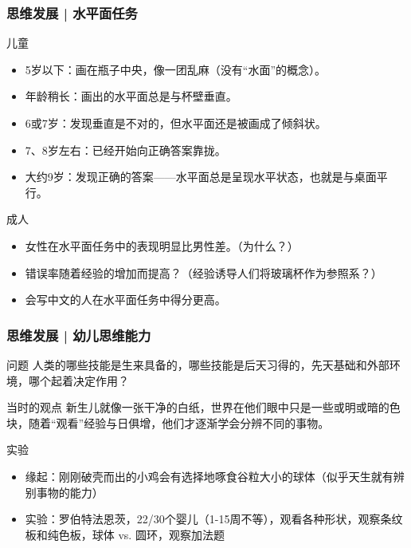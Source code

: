 \begin{frame}
  \frametitle{思维发展 | 水平面任务}
  \begin{block}{儿童}
    \begin{itemize}
      \item 5岁以下：画在瓶子中央，像一团乱麻（没有“水面”的概念）。
      \item 年龄稍长：画出的水平面总是与杯壁垂直。
      \item 6或7岁：发现垂直是不对的，但水平面还是被画成了倾斜状。
      \item 7、8岁左右：已经开始向正确答案靠拢。
      \item 大约9岁：发现正确的答案——水平面总是呈现水平状态，也就是与桌面平行。
    \end{itemize}
  \end{block}
  \pause
  \begin{block}{成人}
    \begin{itemize}
      \item 女性在水平面任务中的表现明显比男性差。（为什么？）
      \item 错误率随着经验的增加而提高？（经验诱导人们将玻璃杯作为参照系？）
      \item 会写中文的人在水平面任务中得分更高。
    \end{itemize}
  \end{block}
\end{frame}

\begin{frame}
  \frametitle{思维发展 | 幼儿思维能力}
  \begin{block}{问题}
    人类的哪些技能是生来具备的，哪些技能是后天习得的，先天基础和外部环境，哪个起着决定作用？
  \end{block}
  \pause
  \begin{block}{当时的观点}
    新生儿就像一张干净的白纸，世界在他们眼中只是一些或明或暗的色块，随着“观看”经验与日俱增，他们才逐渐学会分辨不同的事物。
  \end{block}
  \pause
  \begin{block}{实验}
    \begin{itemize}
      \item 缘起：刚刚破壳而出的小鸡会有选择地啄食谷粒大小的球体（似乎天生就有辨别事物的能力）
      \item 实验：罗伯特\textbullet 法恩茨，22/30个婴儿（1-15周不等），观看各种形状，观察条纹板和纯色板，球体 vs. 圆环，观察加法题
    \end{itemize}
  \end{block}
\end{frame}

